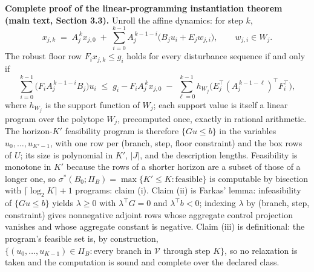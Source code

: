 \documentclass[11pt]{article}
\theoremstyle{definition}
\begin{document}
\bigskip
\noindent\textbf{Complete proof of the linear-programming instantiation theorem (main text,
Section 3.3).} Unroll the affine dynamics: for step \(k\),
\[
x_{j,k} \;=\; A_{j}^{\,k} x_{j,0} \;+\; \sum_{i=0}^{k-1} A_{j}^{\,k-1-i}\bigl(B_{j} u_{i} + E_{j} w_{j,i}\bigr),
\qquad w_{j,i} \in W_{j}.
\]
The robust floor row \(F_{i} x_{j,k} \le g_{i}\) holds for every disturbance sequence if and
only if
\[
\sum_{i=0}^{k-1} \bigl(F_{i} A_{j}^{\,k-1-i} B_{j}\bigr) u_{i}
\;\le\;
g_{i} - F_{i} A_{j}^{\,k} x_{j,0}
\;-\; \sum_{\ell=0}^{k-1} h_{W_{j}}\!\bigl(E_{j}^{\top} (A_{j}^{\,k-1-\ell})^{\top} F_{i}^{\top}\bigr),
\]
where \(h_{W_{j}}\) is the support function of \(W_{j}\); each support value is itself a
linear program over the polytope \(W_{j}\), precomputed once, exactly in rational
arithmetic. The horizon-\(K'\) feasibility program is therefore
\(\{G u \le b\}\) in the variables \(u_{0},\dots,u_{K'-1}\), with one row per (branch, step,
floor constraint) and the box rows of \(U\); its size is polynomial in \(K'\), \(|J|\), and
the description lengths. Feasibility is monotone in \(K'\) because the rows of a shorter
horizon are a subset of those of a longer one, so \(\sigma^{*}(B_{0};\Pi_{B}) = \max\{K'
\le K : \text{feasible}\}\) is computable by bisection with \(\lceil \log_{2} K \rceil + 1\)
programs: claim (i). Claim (ii) is Farkas' lemma: infeasibility of \(\{Gu \le b\}\) yields
\(\lambda \ge 0\) with \(\lambda^{\top} G = 0\) and \(\lambda^{\top} b < 0\); indexing
\(\lambda\) by (branch, step, constraint) gives nonnegative adjoint rows whose aggregate
control projection vanishes and whose aggregate constant is negative. Claim (iii) is
definitional: the program's feasible set is, by construction,
\(\{(u_{0},\dots,u_{K-1}) \in \Pi_{B} : \text{every branch in } \mathcal{V} \text{ through
step } K\}\), so no relaxation is taken and the computation is sound and complete over the
declared class.
\end{document}

